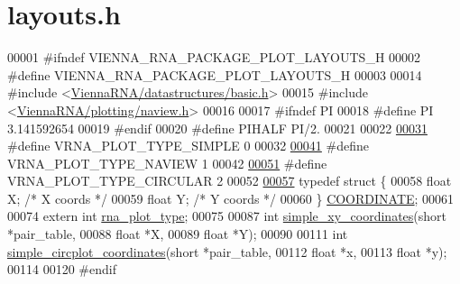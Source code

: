 \hypertarget{layouts_8h_source}{}\section{layouts.\+h}
\label{layouts_8h_source}

\begin{DoxyCode}
00001 \textcolor{preprocessor}{#ifndef VIENNA\_RNA\_PACKAGE\_PLOT\_LAYOUTS\_H}
00002 \textcolor{preprocessor}{#define VIENNA\_RNA\_PACKAGE\_PLOT\_LAYOUTS\_H}
00003 
00014 \textcolor{preprocessor}{#include <\hyperlink{datastructures_2basic_8h}{ViennaRNA/datastructures/basic.h}>}
00015 \textcolor{preprocessor}{#include <\hyperlink{plotting_2naview_8h}{ViennaRNA/plotting/naview.h}>}
00016 
00017 \textcolor{preprocessor}{#ifndef PI}
00018 \textcolor{preprocessor}{#define  PI       3.141592654}
00019 \textcolor{preprocessor}{#endif}
00020 \textcolor{preprocessor}{#define  PIHALF       PI/2.}
00021 
00022 
\hyperlink{group__plotting__utils_gae6d17b9f0a53cf5205a9181e0f8422e9}{00031} \textcolor{preprocessor}{#define VRNA\_PLOT\_TYPE\_SIMPLE     0}
00032 
\hyperlink{group__plotting__utils_ga94d4c863ecac2f220f76658afb92f964}{00041} \textcolor{preprocessor}{#define VRNA\_PLOT\_TYPE\_NAVIEW     1}
00042 
\hyperlink{group__plotting__utils_ga8c9eac631348da92136c8363ecdd9fb9}{00051} \textcolor{preprocessor}{#define VRNA\_PLOT\_TYPE\_CIRCULAR   2}
00052 
\hyperlink{group__plotting__utils}{00057} \textcolor{keyword}{typedef} \textcolor{keyword}{struct }\{
00058   \textcolor{keywordtype}{float} X; \textcolor{comment}{/* X coords */}
00059   \textcolor{keywordtype}{float} Y; \textcolor{comment}{/* Y coords */}
00060 \} \hyperlink{group__plotting__utils_structCOORDINATE}{COORDINATE};
00061 
00074 \textcolor{keyword}{extern} \textcolor{keywordtype}{int} \hyperlink{group__plotting__utils_ga5964c4581431b098b80027d6e14dcdd4}{rna\_plot\_type};
00075 
00087 \textcolor{keywordtype}{int} \hyperlink{group__plotting__utils_gaf4b9173e7d3fd361c3c85e6def194123}{simple\_xy\_coordinates}(\textcolor{keywordtype}{short} *pair\_table,
00088                           \textcolor{keywordtype}{float} *X,
00089                           \textcolor{keywordtype}{float} *Y);
00090 
00111 \textcolor{keywordtype}{int} \hyperlink{group__plotting__utils_gac4ea13d35308f09940178d2b05a248c2}{simple\_circplot\_coordinates}(\textcolor{keywordtype}{short} *pair\_table,
00112                                 \textcolor{keywordtype}{float} *x,
00113                                 \textcolor{keywordtype}{float} *y);
00114 
00120 \textcolor{preprocessor}{#endif}
\end{DoxyCode}
